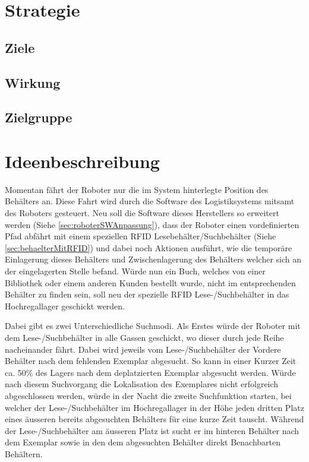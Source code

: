 \chapter{Strategie}

\section{Ziele}

\section{Wirkung}

\section{Zielgruppe}

\chapter{Ideenbeschreibung}


Momentan fährt der Roboter nur die im System hinterlegte Position des Behälters an. Diese Fahrt wird durch die Software des Logistiksystems mitsamt des Roboters gesteuert. Neu soll die Software dieses Herstellers so erweitert werden (Siehe \ref{sec:roboterSWAnpassung}), dass der Roboter einen vordefinierten Pfad abfährt mit einem speziellen RFID Lesebehälter/Suchbehälter (Siehe \ref{sec:behaelterMitRFID}) und dabei noch Aktionen ausführt, wie die temporäre Einlagerung dieses Behälters und Zwischenlagerung des Behälters welcher sich an der eingelagerten Stelle befand.
Würde nun ein Buch, welches von einer Bibliothek oder einem anderen Kunden bestellt wurde, nicht im entsprechenden Behälter zu finden sein, soll neu der spezielle RFID Lese-/Suchbehälter in das Hochregallager geschickt werden.


Dabei gibt es zwei Unterschiedliche Suchmodi. Als Erstes würde der Roboter mit dem Lese-/Suchbehälter in alle Gassen geschickt, wo dieser durch jede Reihe nacheinander fährt. Dabei wird jeweils vom Lese-/Suchbehälter der Vordere Behälter nach dem fehlenden Exemplar abgesucht. So kann in einer Kurzer Zeit ca. 50\% des Lagers nach dem deplatzierten Exemplar abgesucht werden. Würde nach diesem Suchvorgang die Lokalisation des Exemplares nicht erfolgreich abgeschlossen werden, würde in der Nacht die zweite Suchfunktion starten, bei welcher der Lese-/Suchbehälter im Hochregallager in der Höhe jeden dritten Platz eines äusseren bereits abgesuchten Behälters für eine kurze Zeit tauscht. Während der Lese-/Suchbehälter am äusseren Platz ist sucht er im hinteren Behälter nach dem Exemplar sowie in den dem abgesuchten Behälter direkt Benachbarten Behältern.

